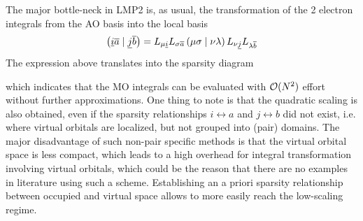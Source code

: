 The major bottle-neck in LMP2 is, as usual, the transformation of the 2 electron integrals from the AO basis into the local basis
\begin{equation}
\left( \underline{i}\overline{a} \mid \underline{j}\overline{b} \right) = L_{\mu \underline{i}} L_{\sigma \overline{a}} \left( \mu\sigma \mid \nu\lambda \right) L_{\nu \underline{j}} L_{\lambda \overline{b}}
\end{equation}
\noindent The expression above translates into the sparsity diagram
\begin{center}
\end{center}
\noindent which indicates that the MO integrals can be evaluated with $\mathcal{O}(N^{2})$ effort without further approximations. One thing to note is that the quadratic scaling is also obtained, even if the sparsity relationships $i \leftrightarrow a$ and $j \leftrightarrow b$ did not exist, i.e. where virtual orbitals are localized, but not grouped into (pair) domains. The major disadvantage of such non-pair specific methods is that the virtual orbital space is less compact, which leads to a high overhead for integral transformation involving virtual orbitals, which could be the reason that there are no examples in literature using such a scheme. Establishing an a priori sparsity relationship between occupied and virtual space allows to more easily reach the low-scaling regime. 

